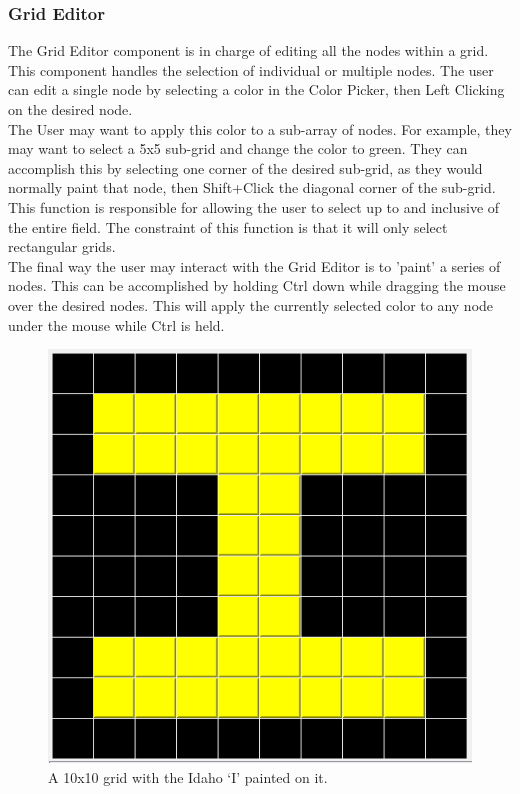 \documentclass[12pt]{article}
\begin{document}
  \subsubsection {Grid Editor}
    The Grid Editor component is in charge of editing all the nodes within a grid. This component handles the selection of individual or multiple nodes. The user can edit a single node by selecting a color in the Color Picker, then Left Clicking on the desired node.
    \\ 	
    The User may want to apply this color to a sub-array of nodes. For example, they may want to select a 5x5 sub-grid and change the color to green. They can accomplish this by selecting one corner of the desired sub-grid, as they would normally paint that node, then Shift+Click the diagonal corner of the sub-grid. This function is responsible for allowing the user to select up to and inclusive of the entire field. The constraint of this function is that it will only select rectangular grids.
    \\
    The final way the user may interact with the Grid Editor is to 'paint' a series of nodes. This can be accomplished by holding Ctrl down while dragging the mouse over the desired nodes. This will apply the currently selected color to any node under the mouse while Ctrl is held. 
   
  \begin{figure}[h]
    \centering
    \includegraphics[width=.6\linewidth]{Grid.png}
    \caption{A 10x10 grid with the Idaho `I' painted on it. }
  \end{figure}
 

 
\end{document}

